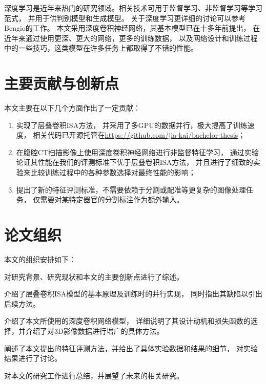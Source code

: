 深度学习是近年来热门的研究领域。相关技术可用于监督学习、非监督学习等学习范式，
并用于供判别模型和生成模型。
关于深度学习更详细的讨论可以参考Bengio的工作\cite{bengio2009learning}。
本文采用深度卷积神经网络，其基本模型已在十多年前提出\cite{lecun1998gradient}，
在近年来通过使用更深、更大的网络，更多的训练数据，
以及网络设计和训练过程中的一些技巧，这类模型在许多任务上都取得了不错的性能。


\section{主要贡献与创新点}
本文主要在以下几个方面作出了一定贡献：

\begin{enumerate}
    \item 实现了层叠卷积ISA方法\cite{wu2013unsupervised}，
        并采用了多GPU的数据并行，极大提高了训练速度，
        相关代码已开源托管在\url{https://github.com/jia-kai/bachelor-thesis}；
    \item 在腹腔CT扫描影像上使用深度卷积神经网络进行非监督特征学习，
        通过实验论证其性能在我们的评测标准下优于层叠卷积ISA方法，
        并且进行了细致的实验来比较训练过程中的各种参数选择对最终性能的影响；
    \item 提出了新的特征评测标准，不需要依赖于分割或配准等更复杂的图像处理任务，
        仅需要对某特定器官的分割标注作为额外输入。
\end{enumerate}

\section{论文组织}
本文的组织安排如下：

对研究背景、研究现状和本文的主要创新点进行了综述。

介绍了层叠卷积ISA模型的基本原理及训练时的并行实现，
同时指出其缺陷以引出后续方法。

介绍了本文所使用的深度卷积网络模型，
详细说明了其设计动机和损失函数的选择，并介绍了对3D影像数据进行增广的具体方法。

阐述了本文提出的特征评测方法，并给出了具体实验数据和结果的细节，
对实验结果进行了讨论。

对本文的研究工作进行总结，并展望了未来的相关研究。


